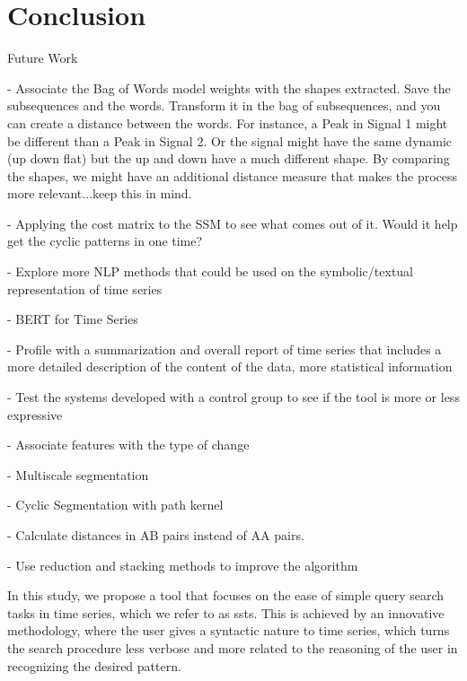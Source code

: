 
%

\chapter{Conclusion}
\label{cha:Conclusion}



Future Work

- Associate the Bag of Words model weights with the shapes extracted. Save the subsequences and the words. Transform it in the bag of subsequences, and you can create a distance between the words. For instance, a Peak in Signal 1 might be different than a Peak in Signal 2. Or the signal might have the same dynamic (up down flat) but the up and down have a much different shape. By comparing the shapes, we might have an additional distance measure that makes the process more relevant...keep this in mind.

- Applying the cost matrix to the SSM to see what comes out of it. Would it help get the cyclic patterns in one time?

- Explore more NLP methods that could be used on the symbolic/textual representation of time series

- BERT for Time Series

- Profile with a summarization and overall report of time series that includes a more detailed description of the content of the data, more statistical information

- Test the systems developed with a control group to see if the tool is more or less expressive

- Associate features with the type of change

- Multiscale segmentation

- Cyclic Segmentation with path kernel

- Calculate distances in AB pairs instead of AA pairs.

- Use reduction and stacking methods to improve the algorithm

In this study, we propose a tool that focuses on the ease of simple query search tasks in time series, which we refer to as \gls{ssts}. This is achieved by an innovative methodology, where the user gives a syntactic nature to time series, which turns the search procedure less verbose and more related to the reasoning of the user in recognizing the desired pattern.
